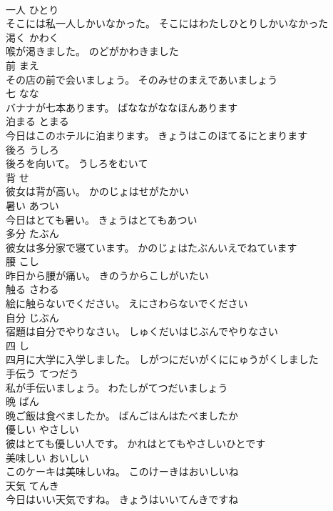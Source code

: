 \documentclass[8pt]{extreport}
\begin{document}
\begin{CJK}{UTF8}{min}
\\	一人	ひとり	
\\	そこには私一人しかいなかった。	そこにはわたしひとりしかいなかった	
\\	渇く	かわく	
\\	喉が渇きました。	のどがかわきました	
\\	前	まえ	
\\	その店の前で会いましょう。	そのみせのまえであいましょう	
\\	七	なな	
\\	バナナが七本あります。	ばなながななほんあります	
\\	泊まる	とまる	
\\	今日はこのホテルに泊まります。	きょうはこのほてるにとまります	
\\	後ろ	うしろ	
\\	後ろを向いて。	うしろをむいて	
\\	背	せ	
\\	彼女は背が高い。	かのじょはせがたかい	
\\	暑い	あつい	
\\	今日はとても暑い。	きょうはとてもあつい	
\\	多分	たぶん	
\\	彼女は多分家で寝ています。	かのじょはたぶんいえでねています	
\\	腰	こし	
\\	昨日から腰が痛い。	きのうからこしがいたい	
\\	触る	さわる	
\\	絵に触らないでください。	えにさわらないでください	
\\	自分	じぶん	
\\	宿題は自分でやりなさい。	しゅくだいはじぶんでやりなさい	
\\	四	し	
\\	四月に大学に入学しました。	しがつにだいがくににゅうがくしました	
\\	手伝う	てつだう	
\\	私が手伝いましょう。	わたしがてつだいましょう	
\\	晩	ばん	
\\	晩ご飯は食べましたか。	ばんごはんはたべましたか	
\\	優しい	やさしい	
\\	彼はとても優しい人です。	かれはとてもやさしいひとです	
\\	美味しい	おいしい	
\\	このケーキは美味しいね。	このけーきはおいしいね	
\\	天気	てんき	
\\	今日はいい天気ですね。	きょうはいいてんきですね	

\end{CJK}
\end{document}
